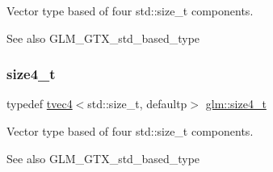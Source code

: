 Vector type based of four std\+::size\+\_\+t components. \begin{DoxySeeAlso}{See also}
G\+L\+M\+\_\+\+G\+T\+X\+\_\+std\+\_\+based\+\_\+type 
\end{DoxySeeAlso}
\mbox{\label{group__gtx__std__based__type_gaa4f69cfac1c3e014a50fd090974092ec}} 
\subsubsection{\texorpdfstring{size4\+\_\+t}{size4\_t}}
{\footnotesize\ttfamily typedef \hyperlink{structglm_1_1tvec4}{tvec4}$<$std\+::size\+\_\+t, defaultp$>$ \hyperlink{group__gtx__std__based__type_gaa4f69cfac1c3e014a50fd090974092ec}{glm\+::size4\+\_\+t}}

Vector type based of four std\+::size\+\_\+t components. \begin{DoxySeeAlso}{See also}
G\+L\+M\+\_\+\+G\+T\+X\+\_\+std\+\_\+based\+\_\+type 
\end{DoxySeeAlso}
